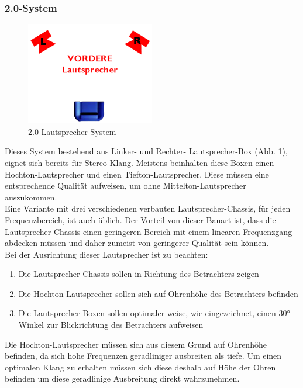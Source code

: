 \subsubsection*{2.0-System}
\begin{figure} [H]
	\centering
	\includegraphics[width=0.5\textwidth]{img/Grundlagen/Mehrweg-Lautsprechersysteme/DOLBYDigital20-cut.jpg}
	\caption{2.0-Lautsprecher-System}
	\label{fig:3.2.3}
\end{figure}

Dieses System bestehend aus Linker- und Rechter- Lautsprecher-Box (Abb. \ref{fig:3.2.3}), eignet sich bereits für Stereo-Klang.
Meistens beinhalten diese Boxen einen Hochton-Lautsprecher und einen Tiefton-Lautsprecher.
Diese müssen eine entsprechende Qualität aufweisen, um ohne Mittelton-Lautsprecher auszukommen.\\
Eine Variante mit drei verschiedenen verbauten Lautsprecher-Chassis, für jeden Frequenzbereich, ist auch üblich.
Der Vorteil von dieser Bauart ist, dass die Lautsprecher-Chassis einen geringeren Bereich mit einem linearen Frequenzgang abdecken müssen und daher zumeist von geringerer Qualität sein können.\\
Bei der Ausrichtung dieser Lautsprecher ist zu beachten:
\begin{enumerate}
	\item Die Lautsprecher-Chassis sollen in Richtung des Betrachters zeigen
	\item Die Hochton-Lautsprecher sollen sich auf Ohrenhöhe des Betrachters befinden
	\item Die Lautsprecher-Boxen sollen optimaler weise, wie eingezeichnet, einen 30° Winkel zur Blickrichtung des Betrachters aufweisen
\end{enumerate}
Die Hochton-Lautsprecher müssen sich aus diesem Grund auf Ohrenhöhe befinden, da sich hohe Frequenzen geradliniger ausbreiten als tiefe.
Um einen optimalen Klang zu erhalten müssen sich diese deshalb auf Höhe der Ohren befinden um diese geradlinige Ausbreitung direkt wahrzunehmen.\\

